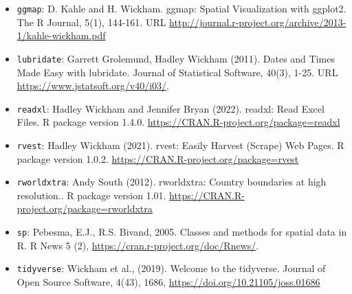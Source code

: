 \documentclass[
]{article}
\providecommand{\tightlist}{%
  \setlength{\itemsep}{0pt}\setlength{\parskip}{0pt}}
\begin{document}
\begin{itemize}
\tightlist
\item
  \texttt{ggmap}: D. Kahle and H. Wickham. ggmap: Spatial Visualization
  with ggplot2. The R Journal, 5(1), 144-161. URL
  \url{http://journal.r-project.org/archive/2013-1/kahle-wickham.pdf}
\item
  \texttt{lubridate}: Garrett Grolemund, Hadley Wickham (2011). Dates
  and Times Made Easy with lubridate. Journal of Statistical Software,
  40(3), 1-25. URL \url{https://www.jstatsoft.org/v40/i03/}.
\item
  \texttt{readxl}: Hadley Wickham and Jennifer Bryan (2022). readxl:
  Read Excel Files. R package version 1.4.0.
  \url{https://CRAN.R-project.org/package=readxl}
\item
  \texttt{rvest}: Hadley Wickham (2021). rvest: Easily Harvest (Scrape)
  Web Pages. R package version 1.0.2.
  \url{https://CRAN.R-project.org/package=rvest}
\item
  \texttt{rworldxtra}: Andy South (2012). rworldxtra: Country boundaries
  at high resolution.. R package version 1.01.
  \url{https://CRAN.R-project.org/package=rworldxtra}
\item
  \texttt{sp}: Pebesma, E.J., R.S. Bivand, 2005. Classes and methods for
  spatial data in R. R News 5 (2),
  \url{https://cran.r-project.org/doc/Rnews/}.
\item
  \texttt{tidyverse}: Wickham et al., (2019). Welcome to the tidyverse.
  Journal of Open Source Software, 4(43), 1686,
  \url{https://doi.org/10.21105/joss.01686}
\end{itemize}
\end{document}
